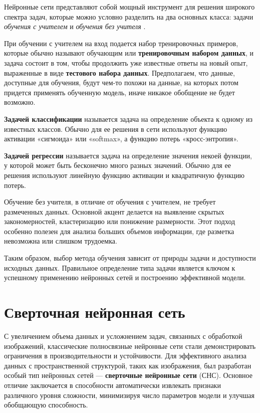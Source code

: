 \documentclass[12pt, a4paper]{article}
\begin{document}
Нейронные сети представляют собой мощный инструмент для решения широкого спектра задач, которые можно условно разделить на два основных класса: задачи \textit{обучения с учителем} и \textit{обучения без учителя} \cite[c.17]{3}.

При обучении с учителем на вход подается набор тренировочных примеров, которые обычно называют обучающим или \textbf{тренировочным набором данных}, и задача состоит в том, чтобы продолжить уже известные ответы на новый опыт, выраженные в виде \textbf{тестового набора данных}. Предполагаем, что данные, доступные для обучения, будут чем-то похожи на данные, на которых потом придется применять обученную модель, иначе никакое обобщение не будет возможно.

  \textbf{Задачей классификации} называется задача на определение объекта к одному из известных классов. Обычно для ее решения в сети используют функцию активации «сигмоида» или «softmax», а функцию потерь «кросс-энтропия». 

 \textbf{Задачей регрессии} называется задача на определение значения некоей функции, у которой может быть бесконечно много разных значений. Обычно для ее решения используют линейную функцию активации и квадратичную функцию потерь.


Обучение без учителя, в отличие от обучения с учителем, не требует размеченных данных. Основной акцент делается на выявление скрытых закономерностей, кластеризацию или понижение размерности. Этот подход особенно полезен для анализа больших объемов информации, где разметка невозможна или слишком трудоемка.

Таким образом, выбор метода обучения зависит от природы задачи и доступности исходных данных. Правильное определение типа задачи является ключом к успешному применению нейронных сетей и построению эффективной модели.




 
 
 
 



\section{Сверточная нейронная сеть}
С увеличением объема данных и усложнением задач, связанных с обработкой изображений, классические полносвязные нейронные сети стали демонстрировать ограничения в производительности и устойчивости. Для эффективного анализа данных с пространственной структурой, таких как изображения, был разработан особый тип нейронных сетей — \textbf{сверточные нейронные сети} (СНС). Основное отличие заключается в способности автоматически извлекать признаки различного уровня сложности, минимизируя число параметров модели и улучшая обобщающую способность. 
\end{document}
